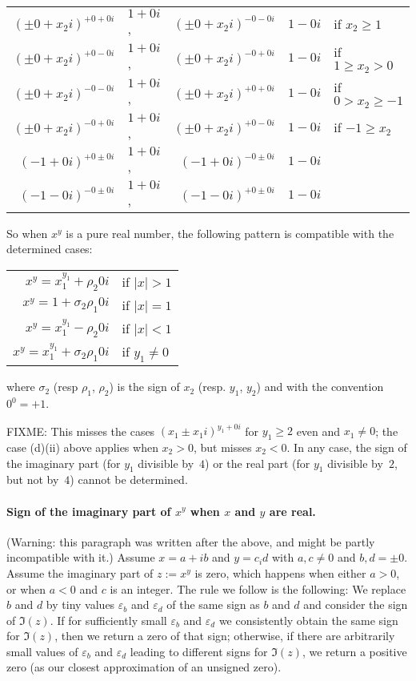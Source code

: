 \documentclass [11pt]{article}
\renewcommand {\geq}{\geqslant}
\begin{document}
\begin{tabular}{r@{ $=$ }lr@{ $=$ }ll}
  $(\pm 0 +x_2i)^{+0 +0i}$ & $1 +0i$, &
  $(\pm 0 +x_2i)^{-0 -0i}$ & $1 -0i$ &
  if $x_2 \geq 1$ \\
  $(\pm 0 +x_2i)^{+0 -0i}$ & $1 +0i$, &
  $(\pm 0 +x_2i)^{-0 +0i}$ & $1 -0i$ &
  if $1 \geq x_2 > 0$ \\
  $(\pm 0 +x_2i)^{-0 -0i}$ & $1 +0i$, &
  $(\pm 0 +x_2i)^{+0 +0i}$ & $1 -0i$ &
  if $ 0 > x_2 \geq -1$ \\
  $(\pm 0 +x_2i)^{-0 +0i}$ & $1 +0i$, &
  $(\pm 0 +x_2i)^{+0 -0i}$ & $1 -0i$ &
  if $-1 \geq x_2$ \\

  $(-1 +0i)^{+0 \pm0i}$ & $1+0i$, &
  $(-1 +0i)^{-0 \pm0i}$ & $1-0i$ \\
  $(-1 -0i)^{-0 \pm0i}$ & $1+0i$, &
  $(-1 -0i)^{+0 \pm0i}$ & $1-0i$ \\
\end{tabular}

So when $x^y$ is a pure real number, the following pattern is compatible with
the determined cases:

\begin{tabular}{rl}
  $x^y = x_1^{y_1} + \rho_2 0i$ & if $|x| > 1$\\
  $x^y = 1 + \sigma_2 \rho_1 0i$ & if $|x| = 1$\\
  $x^y = x_1^{y_1} - \rho_2 0i$ & if $|x| < 1$\\
  $x^y = x_1^{y_1} + \sigma_2 \rho_1 0i$ & if $y_1 \neq 0$
\end{tabular}

where $\sigma_2$ (resp $\rho_1$, $\rho_2$) is the sign of $x_2$ (resp. $y_1$,
$y_2$) and with the convention $0^0=+1$.

FIXME: This misses the cases $(x_1 \pm x_1 i)^{y_1 + 0 i}$ for $y_1 \geq 2$
even and $x_1 \neq 0$; the case (d)(ii) above applies when $x_2 > 0$, but
misses $x_2 < 0$. In any case, the sign of the imaginary part
(for $y_1$ divisible by~$4$)
or the real part
(for $y_1$ divisible by~$2$, but not by~$4$)
cannot be determined.

\paragraph{Sign of the imaginary part of $x^y$ when $x$ and $y$ are real.}
(Warning: this paragraph was written after the above, and might be
partly incompatible with it.)
Assume $x = a + i b$ and $y = c_i d$ with $a, c \neq 0$ and $b, d = \pm 0$.
Assume the imaginary part of $z := x^y$ is zero, which happens when
either $a > 0$, or when $a < 0$ and $c$ is an integer.
The rule we follow is the following: We replace $b$ and $d$ by tiny
values $\varepsilon_b$ and $\varepsilon_d$ of the same sign as $b$ and $d$
and consider the sign of $\Im(z)$. If for sufficiently small
$\varepsilon_b$ and $\varepsilon_d$ we consistently obtain the same sign
for $\Im(z)$, then we return a zero of that sign;
otherwise, if there are arbitrarily small values of
$\varepsilon_b$ and $\varepsilon_d$ leading to different signs
for $\Im(z)$, we return a positive zero (as our closest approximation
of an unsigned zero).
\end{document}
